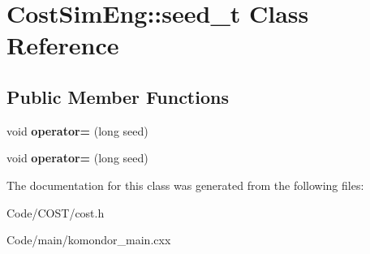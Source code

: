 \hypertarget{classCostSimEng_1_1seed__t}{}\section{Cost\+Sim\+Eng\+:\+:seed\+\_\+t Class Reference}
\label{classCostSimEng_1_1seed__t}
\subsection*{Public Member Functions}
\begin{DoxyCompactItemize}
\item 
\mbox{\label{classCostSimEng_1_1seed__t_adf6e950876dd9526f061b32944b0d13d}} 
void {\bfseries operator=} (long seed)
\item 
\mbox{\label{classCostSimEng_1_1seed__t_adf6e950876dd9526f061b32944b0d13d}} 
void {\bfseries operator=} (long seed)
\end{DoxyCompactItemize}


The documentation for this class was generated from the following files\+:\begin{DoxyCompactItemize}
\item 
Code/\+C\+O\+S\+T/cost.\+h\item 
Code/main/komondor\+\_\+main.\+cxx\end{DoxyCompactItemize}
